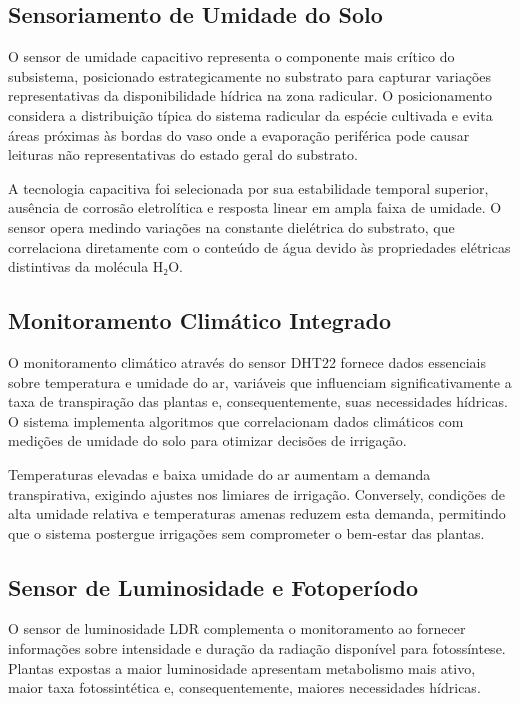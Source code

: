 \documentclass[twoside,english,brazilian]{UNISINOSmonografia}
\begin{document}
\subsection{Sensoriamento de Umidade do Solo}

O sensor de umidade capacitivo representa o componente mais crítico do subsistema, posicionado estrategicamente no substrato para capturar variações representativas da disponibilidade hídrica na zona radicular. O posicionamento considera a distribuição típica do sistema radicular da espécie cultivada e evita áreas próximas às bordas do vaso onde a evaporação periférica pode causar leituras não representativas do estado geral do substrato.

A tecnologia capacitiva foi selecionada por sua estabilidade temporal superior, ausência de corrosão eletrolítica e resposta linear em ampla faixa de umidade. O sensor opera medindo variações na constante dielétrica do substrato, que correlaciona diretamente com o conteúdo de água devido às propriedades elétricas distintivas da molécula H₂O.

\subsection{Monitoramento Climático Integrado}

O monitoramento climático através do sensor DHT22 fornece dados essenciais sobre temperatura e umidade do ar, variáveis que influenciam significativamente a taxa de transpiração das plantas e, consequentemente, suas necessidades hídricas. O sistema implementa algoritmos que correlacionam dados climáticos com medições de umidade do solo para otimizar decisões de irrigação.

Temperaturas elevadas e baixa umidade do ar aumentam a demanda transpirativa, exigindo ajustes nos limiares de irrigação. Conversely, condições de alta umidade relativa e temperaturas amenas reduzem esta demanda, permitindo que o sistema postergue irrigações sem comprometer o bem-estar das plantas.

\subsection{Sensor de Luminosidade e Fotoperíodo}

O sensor de luminosidade LDR complementa o monitoramento ao fornecer informações sobre intensidade e duração da radiação disponível para fotossíntese. Plantas expostas a maior luminosidade apresentam metabolismo mais ativo, maior taxa fotossintética e, consequentemente, maiores necessidades hídricas.
\end{document}
